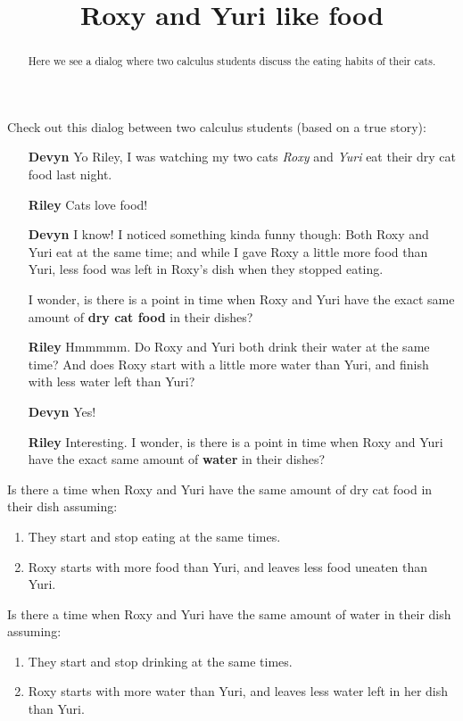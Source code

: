 \documentclass{ximera}
\title[Break-Ground:]{Roxy and Yuri like food}
\begin{document}
\begin{abstract}
Here we see a dialog where two calculus students discuss the eating
habits of their cats.
\end{abstract}
\maketitle

Check out this dialog between two calculus students (based on a true
story):

\begin{itemize}
  \item[\textbf{Devyn}] Yo Riley, I was watching my two cats
    \textit{Roxy} and \textit{Yuri} eat their dry cat food last night.
\item[\textbf{Riley}] Cats love food!
\item[\textbf{Devyn}] I know! I noticed something kinda funny though:
  Both Roxy and Yuri eat at the same time; and while I gave Roxy a
  little more food than Yuri, less food was left in Roxy's dish when
  they stopped eating.

  I wonder, is there is a point in time when Roxy and Yuri have the
  exact same amount of \textbf{dry cat food} in their dishes?
\item[\textbf{Riley}] Hmmmmm. Do Roxy and Yuri both drink their water
  at the same time?  And does Roxy start with a little more water than
  Yuri, and finish with less water left than Yuri?
  \item[\textbf{Devyn}] Yes!
\item[\textbf{Riley}] Interesting. I wonder, is there is a point in
  time when Roxy and Yuri have the exact same amount of \textbf{water}
  in their dishes?
\end{itemize}

\begin{problem}
  Is there a time when Roxy and Yuri have the same amount of dry cat
  food in their dish assuming:
  \begin{enumerate}
  \item They start and stop eating at the same times.
  \item Roxy starts with more food than Yuri, and leaves less food uneaten than Yuri. 
  \end{enumerate}
  \begin{freeResponse}
\end{freeResponse}
\end{problem}

\begin{problem}
  Is there a time when Roxy and Yuri have the same amount of water in
  their dish assuming:
  \begin{enumerate}
  \item They start and stop drinking at the same times.
  \item Roxy starts with more water than Yuri, and leaves less water
    left in her dish than Yuri.
  \end{enumerate}
  \begin{freeResponse}
\end{freeResponse}
\end{problem}
\end{document}
